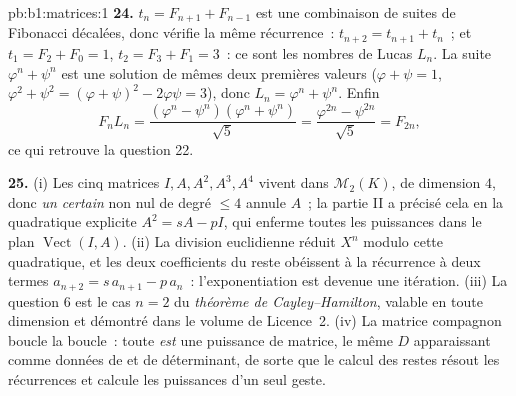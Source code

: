 \begin{solution}{pb:b1:matrices:1}
\textbf{24.} $t_n = F_{n+1} + F_{n-1}$ est une combinaison de
suites de Fibonacci décalées, donc vérifie la même
récurrence~: $t_{n+2} = t_{n+1} + t_n$~; et $t_1 = F_2 + F_0 =
1$, $t_2 = F_3 + F_1 = 3$~: ce sont les nombres de Lucas $L_n$.
La suite $\varphi^n + \psi^n$ est une solution de mêmes
deux premières valeurs ($\varphi + \psi = 1$, $\varphi^2 + \psi^2 = (
\varphi + \psi)^2 - 2\varphi\psi = 3$), donc $L_n = \varphi^n +
\psi^n$. Enfin
\[
F_n L_n = \frac{(\varphi^n - \psi^n)(\varphi^n +
\psi^n)}{\sqrt5} = \frac{\varphi^{2n} - \psi^{2n}}{\sqrt5} =
F_{2n},
\]
ce qui retrouve la question 22.

\textbf{25.} (i) Les cinq matrices $I, A, A^2, A^3, A^4$ vivent dans
$\mathcal{M}_2(K)$, de dimension $4$, donc \emph{un certain} 
non nul de degré $\leq 4$ annule $A$~; la partie II a précisé cela
en la quadratique explicite $A^2 = sA - pI$, qui enferme toutes les
puissances dans le plan $\operatorname{Vect}(I, A)$. (ii)
La division euclidienne réduit $X^n$ modulo cette quadratique, et les
deux coefficients du reste obéissent à la récurrence à deux termes
$a_{n+2} = s\,a_{n+1} - p\,a_n$~: l'exponentiation est devenue une
itération. (iii) La question 6 est le cas $n = 2$ du
\emph{théorème de Cayley--Hamilton}, valable en toute dimension et
démontré dans le volume de Licence~2. (iv) La matrice compagnon boucle
la boucle~: toute  \emph{est} une puissance de
matrice, le même  $D$ apparaissant comme données de  et de
déterminant, de sorte que le calcul des restes résout les récurrences
et calcule les puissances d'un seul geste.
\end{solution}
